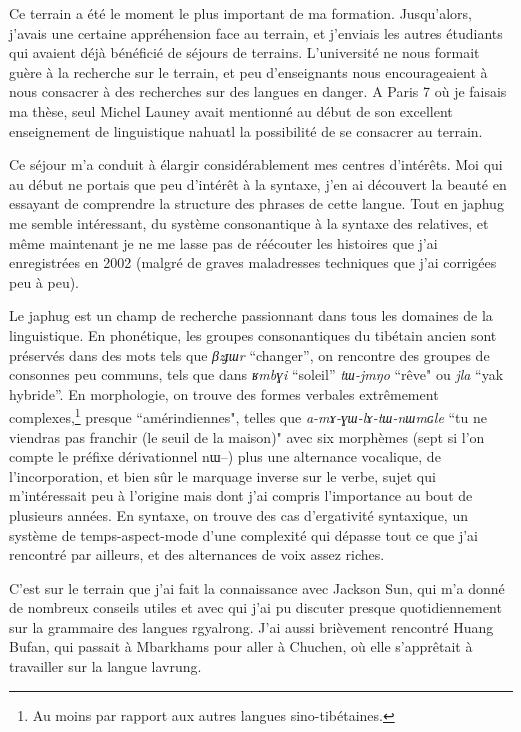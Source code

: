 \documentclass[oldfontcommands,oneside,a4paper,11pt]{memoir}
\begin{document}
 Ce terrain a été le moment le plus important de ma formation. Jusqu'alors, j'avais une certaine appréhension face au terrain, et j'enviais les autres étudiants qui avaient déjà bénéficié de séjours de terrains. L'université ne nous formait guère à la recherche sur le terrain, et peu d'enseignants nous encourageaient à nous consacrer à des recherches sur des langues en danger. A Paris 7 où je faisais ma thèse, seul Michel Launey avait mentionné au début de son excellent enseignement de linguistique nahuatl la possibilité de se consacrer au terrain. 

Ce séjour  m'a conduit à élargir considérablement mes centres d'intérêts. Moi qui au début ne portais que peu d'intérêt à la syntaxe, j'en ai découvert la beauté en essayant de comprendre la structure des phrases de cette langue. Tout en japhug me semble intéressant, du système consonantique à la syntaxe des relatives, et même maintenant je ne me lasse pas de réécouter les histoires que j'ai enregistrées en 2002   (malgré de graves maladresses techniques que j'ai corrigées peu à peu).  

Le japhug est un champ  de recherche passionnant dans tous les domaines de la linguistique.   En phonétique, les   groupes consonantiques du tibétain ancien sont préservés dans des mots tels que \textit{βzɟɯr} ``changer'', on rencontre des groupes de consonnes peu communs, tels que dans \textit{ʁmbɣi} ``soleil''   \textit{tɯ-jmŋo} ``rêve" ou \textit{jla} ``yak hybride''. En morphologie, on trouve des formes verbales extrêmement complexes,\footnote{Au moins par rapport aux autres langues sino-tibétaines.} presque ``amérindiennes", telles que \textit{a-mɤ-ɣɯ-lɤ-tɯ-nɯmɢle} ``tu ne viendras pas franchir (le seuil de la maison)" avec six morphèmes (sept si l'on compte le préfixe dérivationnel nɯ--) plus une alternance vocalique,  de l'incorporation, et bien sûr le marquage inverse sur le verbe, sujet qui   m'intéressait peu à l'origine mais dont j'ai compris l'importance au bout de plusieurs années. En syntaxe, on trouve des cas d'ergativité syntaxique, un système de temps-aspect-mode d'une complexité qui dépasse tout ce que j'ai rencontré par ailleurs, et des alternances de voix assez riches.

 

C'est sur le terrain que j'ai fait la connaissance avec Jackson Sun, qui m'a donné de nombreux conseils utiles et avec qui j'ai pu discuter presque quotidiennement sur la grammaire des langues rgyalrong. J'ai aussi brièvement rencontré Huang Bufan, qui passait à Mbarkhams pour aller à Chuchen, où elle s'apprêtait à travailler sur la langue lavrung.
\end{document}

